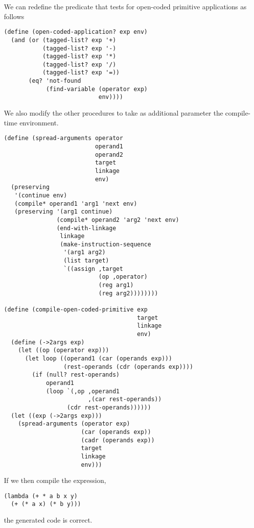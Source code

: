 \documentclass[a4paper,12pt]{article}
\begin{document}
We can redefine the predicate that tests for open-coded primitive
applications as follows
\begin{lstlisting}
(define (open-coded-application? exp env)
  (and (or (tagged-list? exp '+)
           (tagged-list? exp '-)
           (tagged-list? exp '*)
           (tagged-list? exp '/)
           (tagged-list? exp '=))
       (eq? 'not-found
            (find-variable (operator exp)
                           env))))
\end{lstlisting}

We also modify the other procedures to take as additional parameter
the compile-time environment.

\begin{lstlisting}
(define (spread-arguments operator
                          operand1
                          operand2
                          target
                          linkage
                          env)
  (preserving
   '(continue env)
   (compile* operand1 'arg1 'next env)
   (preserving '(arg1 continue)
               (compile* operand2 'arg2 'next env)
               (end-with-linkage
                linkage
                (make-instruction-sequence
                 '(arg1 arg2)
                 (list target)
                 `((assign ,target
                           (op ,operator)
                           (reg arg1)
                           (reg arg2))))))))

(define (compile-open-coded-primitive exp
                                      target
                                      linkage
                                      env)
  (define (->2args exp)
    (let ((op (operator exp)))
      (let loop ((operand1 (car (operands exp)))
                 (rest-operands (cdr (operands exp))))
        (if (null? rest-operands)
            operand1
            (loop `(,op ,operand1
                        ,(car rest-operands))
                  (cdr rest-operands))))))
  (let ((exp (->2args exp)))
    (spread-arguments (operator exp)
                      (car (operands exp))
                      (cadr (operands exp))
                      target
                      linkage
                      env)))
\end{lstlisting}

If we then compile the expression,
\begin{lstlisting}
(lambda (+ * a b x y)
  (+ (* a x) (* b y)))
\end{lstlisting}

the generated code is correct.
\end{document}
